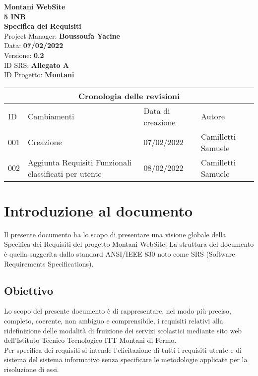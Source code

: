 \documentclass{article}
\begin{document}
	
	
	\begin{titlepage}
		\begin{center}
			\huge\textbf{Montani WebSite}\\
			\Large\textbf{5 INB}\\
			\Large \textbf{Specifica dei Requisiti}\\
			\vspace{4cm}
			\large Project Manager: \textbf{Boussoufa Yacine}\\
			\large Data: \textbf{07/02/2022}\\
			\large Versione: \textbf{0.2}\\
			\large ID SRS: \textbf{Allegato A}\\
			\large ID Progetto: \textbf{Montani}\\
			
		\end{center}
	\end{titlepage}
	
	\clearpage
	
	\begin{tabular}{ |p{1cm}|p{4cm}|p{3cm}|p{2cm}|  }
		\hline
		\multicolumn{4}{|c|}{Cronologia delle revisioni} \\
		\hline
		ID& Cambiamenti &Data di creazione&Autore\\
		\hline
		001   & Creazione    &07/02/2022&   Camilletti Samuele\\
		\hline
		002   & Aggiunta Requisiti Funzionali classificati per utente    &08/02/2022&   Camilletti Samuele\\
		\hline
	\end{tabular}
	
	\clearpage
	
	\tableofcontents
	\printindex	
	
   

	\section{\textbf{Introduzione al documento}}
	\flushleft
	\normalsize
	Il presente documento ha lo scopo di presentare una visione globale della Specifica dei Requisiti del progetto Montani WebSite. La struttura del documento è quella suggerita dallo standard ANSI/IEEE  830 noto come SRS (Software Requirements Specifications).
	\normalsize
	 \subsection{\textbf{Obiettivo}} 
	\flushleft
	\normalsize
	Lo scopo del presente documento è di rappresentare, nel modo più preciso, completo, coerente, non  ambiguo e comprensibile, i requisiti relativi alla ridefinizione delle modalità di fruizione dei servizi scolastici mediante sito web dell'Istituto Tecnico Tecnologico ITT Montani di Fermo.\\ 
	Per specifica dei requisiti si intende l’elicitazione di tutti i requisiti utente e di sistema del sistema informativo senza specificare le metodologie applicate per la risoluzione di essi.
	
\end{document}
